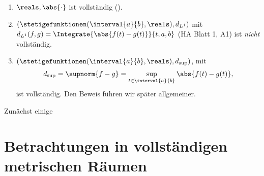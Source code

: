\begin{beispiele}
    \begin{enumerate}
        
        \item \label{r_ist_vollstaendig} \( \reals ,\abs{\cdot} \) ist vollständig ().
        \item \label{integral_metrischer_raum_ist_nicht_vollstaendig} \( (\stetigefunktionen(\interval{a}{b} ,\reals), d_{L^1})\) mit \( d_{L^1}(f,g)=\Integrate{\abs{f(t)-g(t)}}{t,a,b}\) (\vgl HA Blatt 1, A1) ist \emph{nicht} vollständig. 
        \item \( (\stetigefunktionen(\interval{a}{b},\reals ), d_{\sup})\), mit
        \begin{align*}
            d_{\sup}=\supnorm{f-g}=\sup_{t\in \interval{a}{b}}\abs{f(t)-g(t)},
        \end{align*}
        ist vollständig.
        Den Beweis führen wir später allgemeiner.
    \end{enumerate}
    

\end{beispiele}
Zunächst einige 
\section*{Betrachtungen in vollständigen metrischen Räumen}

